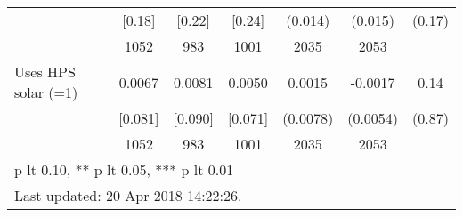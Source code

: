 \begin{table}[htbp]
\begin{tabular*}{1\hsize}{@{\hskip\tabcolsep\extracolsep\fill}l*{1}{cccccc}}
                                &   [0.18]&   [0.22]&   [0.24]&  (0.014)         &  (0.015)         &   (0.17)         \\
                                &     1052&      983&     1001&     2035         &     2053         &                  \\
Uses HPS solar (=1)             &   0.0067&   0.0081&   0.0050&   0.0015         &  -0.0017         &     0.14         \\
                                &  [0.081]&  [0.090]&  [0.071]& (0.0078)         & (0.0054)         &   (0.87)         \\
                                &     1052&      983&     1001&     2035         &     2053         &                  \\
\bottomrule
\multicolumn{7}{l}{\footnotesize * p lt 0.10, ** p lt 0.05, *** p lt 0.01}\\
\multicolumn{7}{l}{\footnotesize Last updated: 20 Apr 2018 14:22:26.}\\
\end{tabular*}
\end{table}
